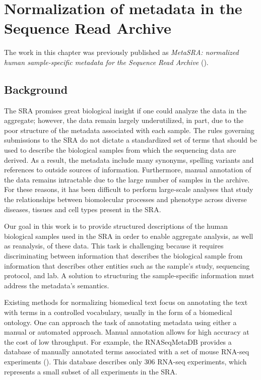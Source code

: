 \chapter{Normalization of metadata in the Sequence Read Archive} \label{chap:1}

The work in this chapter was previously published as \textit{MetaSRA: normalized human sample-specific metadata for the Sequence Read Archive} (\citealp{Bernstein2017}). 

\section{Background}

The SRA promises great biological insight if one could analyze the data in the aggregate; however, the data remain largely underutilized, in part, due to the poor structure of the metadata associated with each sample. The rules governing submissions to the SRA do not dictate a standardized set of terms that should be used to describe the biological samples from which the sequencing data are derived. As a result, the metadata include many synonyms, spelling variants and references to outside sources of information. Furthermore, manual annotation of the data remains intractable due to the large number of samples in the archive. For these reasons, it has been difficult to perform large-scale analyses that study the relationships between biomolecular processes and phenotype across diverse diseases, tissues and cell types present in the SRA.

Our goal in this work is to provide structured descriptions of the human biological samples used in the SRA in order to enable aggregate analysis, as well as reanalysis, of these data.  This task is challenging because it requires discriminating between information that describes the biological sample from information that describes other entities such as the sample's study, sequencing protocol, and lab. A solution to structuring the sample-specific information must address the metadata's semantics. 

Existing methods for normalizing biomedical text focus on annotating the text with terms in a controlled vocabulary, usually in the form of a biomedical ontology.  One can approach the task of annotating metadata using either a manual or automated approach.  Manual annotation allows for high accuracy at the cost of low throughput.  For example, the RNASeqMetaDB  provides a database of manually annotated terms associated with a set of mouse RNA-seq experiments (\citealp{Guo}).  This database describes only 306 RNA-seq experiments, which represents a small subset of all experiments in the SRA. 

